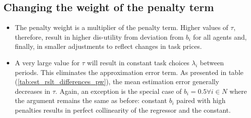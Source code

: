 \documentclass{article}
\begin{document}
	\subsection{Changing the weight of the penalty term}
		\begin{itemize}
			\item{The penalty weight is a multiplier of the penalty term. Higher values of $\tau$, therefore, result in higher dis-utility from deviation from $b_i$ for all agents and, finally, in smaller adjustments to reflect changes in task prices.}
			\item{A very large value for $\tau$ will result in constant task choices $\lambda_i$ between periods. This eliminates the approximation error term. As presented in table (\ref{tab:est_rslt_differences_pw}), the mean estimation error generally decreases in $\tau$. Again, an exception is the special case of $b_i = 0.5 \forall i \in N$ where the argument remains the same as before: constant $b_i$ paired with high penalties results in perfect collinearity of the regressor and the constant.}
		\end{itemize}
\end{document}

